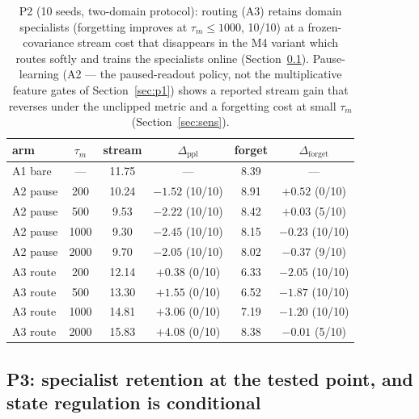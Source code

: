 \documentclass[preprint,12pt]{elsarticle}
\begin{document}
\begin{table}[t]
\centering
\small
\begin{tabular}{lccccc}
\toprule
arm & $\tau_m$ & stream & $\Delta_{\mathrm{ppl}}$ & forget &
$\Delta_{\mathrm{forget}}$ \\
\midrule
A1 bare & --- & 11.75 & --- & 8.39 & --- \\
A2 pause & 200 & 10.24 & $-1.52$ (10/10) & 8.91 & $+0.52$ (0/10) \\
A2 pause & 500 & 9.53 & $-2.22$ (10/10) & 8.42 & $+0.03$ (5/10) \\
A2 pause & 1000 & 9.30 & $-2.45$ (10/10) & 8.15 & $-0.23$ (10/10) \\
A2 pause & 2000 & 9.70 & $-2.05$ (10/10) & 8.02 & $-0.37$ (9/10) \\
A3 route & 200 & 12.14 & $+0.38$ (0/10) & 6.33 & $-2.05$ (10/10) \\
A3 route & 500 & 13.30 & $+1.55$ (0/10) & 6.52 & $-1.87$ (10/10) \\
A3 route & 1000 & 14.81 & $+3.06$ (0/10) & 7.19 & $-1.20$ (10/10) \\
A3 route & 2000 & 15.83 & $+4.08$ (0/10) & 8.38 & $-0.01$ (5/10) \\
\bottomrule
\end{tabular}
\caption{P2 (10 seeds, two-domain protocol): routing (A3) retains domain
specialists (forgetting improves at $\tau_m \le 1000$, 10/10) at a
frozen-covariance stream cost that disappears in the M4 variant which
routes softly and trains the specialists online
(Section~\ref{sec:p3}). Pause-learning (A2 --- the paused-readout policy,
not the multiplicative feature gates of Section~\ref{sec:p1}) shows a
reported stream gain that reverses under the unclipped metric and a
forgetting cost at small $\tau_m$ (Section~\ref{sec:sens}).}
\label{tab:p2}
\end{table}

\subsection{P3: specialist retention at the tested point, and state
regulation is conditional}
\label{sec:p3}
\end{document}
